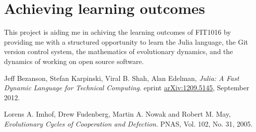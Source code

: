 \documentclass[a4paper,11pt]{article}
\begin{document}
\section*{Achieving learning outcomes}

This project is aiding me in achiving the learning outcomes of FIT1016 by providing me with a structured opportunity to learn the Julia language, the Git version control system, the mathematics of evolutionary dynamics, and the dynamics of working on open source software.



\begin{thebibliography}{9}

        Jeff Bezanson, Stefan Karpinski, Viral B. Shah, Alan Edelman,
        \emph{Julia: A Fast Dynamic Language for Technical Computing}.
        eprint \href{http://arxiv.org/pdf/1209.5145v1.pdf}{arXiv:1209.5145},
        September 2012.

        Lorens A. Imhof, Drew Fudenberg, Martin A. Nowak and Robert M. May,
        \emph{Evolutionary Cycles of Cooperation and Defection}.
        PNAS,
        Vol. 102,
        No. 31, 
        2005.

\end{thebibliography}
\end{document}
